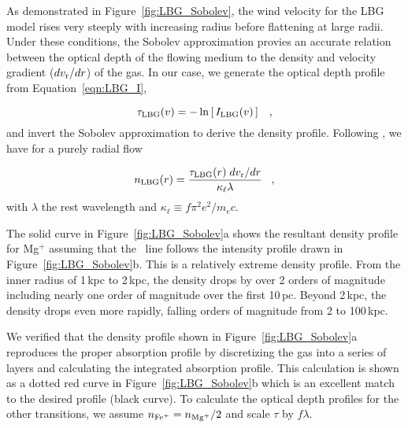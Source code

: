 \documentclass[12pt,preprint]{aastex}
\begin{document}
As demonstrated in Figure~\ref{fig:LBG_Sobolev}, the wind velocity for
the LBG model rises very steeply with increasing radius before
flattening at large radii.  Under these conditions, the Sobolev
approximation provies an accurate relation between the optical depth
of the flowing medium to the
density and velocity gradient ($dv_{\rm r}/dr$) of the gas.  In our case, we 
generate the optical depth profile from Equation~\ref{eqn:LBG_I}, 

\begin{equation}
\tau_{\rm LBG}(v) = -\ln \left [ \, I_{\rm LBG}(v) \, \right ] \;\;\; ,
\label{eqn:tauLBG}
\end{equation}
and invert the Sobolev approximation to derive the density profile.
Following \cite{lc99}, we have for a purely radial flow

\begin{equation}
n_{\rm LBG}(r) = \frac{\tau_{\rm LBG}(r) \; dv_{\rm r}/dr}{\kappa_\ell
  \lambda} \;\;\; ,
\label{eqn:Sobolev}
\end{equation}
with $\lambda$ the rest wavelength and $\kappa_\ell \equiv f\pi^2
e^2/m_e c$.  

The solid curve in Figure~\ref{fig:LBG_Sobolev}a shows the
resultant density profile for Mg$^+$ assuming that the \mgiia\ line
follows the intensity profile drawn in Figure~\ref{fig:LBG_Sobolev}b. 
This is a relatively extreme density profile.  From the inner radius
of 1\,kpc to 2\,kpc, the density drops by over 2 orders of
magnitude including nearly one order of magnitude over the first
10\,pc.  Beyond 2\,kpc, the density drops even more rapidly, falling
orders of magnitude from 2 to 100\,kpc.

We verified that the density profile shown in
Figure~\ref{fig:LBG_Sobolev}a
reproduces the proper
absorption profile by discretizing the gas into a series of layers
and calculating the integrated absorption profile.  This
calculation is shown as a dotted red curve in
Figure~\ref{fig:LBG_Sobolev}b which is an excellent
match to the desired profile (black curve).
To calculate the optical depth profiles for the other transitions, we
assume $n_{\rm Fe^+} = n_{\rm Mg^+}/2$ and scale $\tau$ by $f\lambda$.
\end{document}
